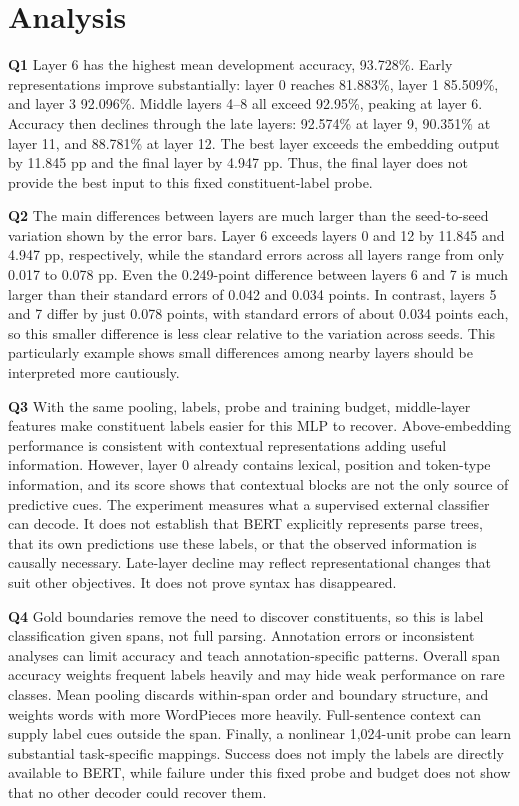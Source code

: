 \documentclass[11pt]{article}
\begin{document}
\newpage
\section*{Analysis}
\textbf{Q1}
Layer 6 has the highest mean development accuracy, 93.728\%. Early
representations improve substantially: layer 0 reaches 81.883\%, layer 1
85.509\%, and layer 3 92.096\%. Middle layers 4--8 all exceed 92.95\%, peaking
at layer 6. Accuracy then declines through the late layers: 92.574\% at layer 9,
90.351\% at layer 11, and 88.781\% at layer 12. The best layer exceeds the
embedding output by 11.845 pp and the final layer by 4.947 pp. Thus, the final
layer does not provide the best input to this fixed constituent-label probe.

\textbf{Q2}
The main differences between layers are much larger than the seed-to-seed
variation shown by the error bars. Layer 6 exceeds layers 0 and 12 by
11.845 and 4.947 pp, respectively, while the standard errors
across all layers range from only 0.017 to 0.078 pp.
Even the 0.249-point difference between layers 6 and 7 is much larger than
their standard errors of 0.042 and 0.034 points. In contrast, layers 5 and 7
differ by just 0.078 points, with standard errors of about 0.034 points each,
so this smaller difference is less clear relative to the variation across seeds. This particularly example shows small differences among nearby layers should be interpreted more cautiously.

\textbf{Q3}
With the same pooling, labels, probe and training budget, middle-layer features
make constituent labels easier for this MLP to recover. Above-embedding
performance is consistent with contextual representations adding useful
information. However, layer 0 already contains lexical, position and token-type
information, and its score shows that contextual blocks are not the only source
of predictive cues. The experiment measures what a supervised external
classifier can decode. It does not establish that BERT explicitly represents
parse trees, that its own predictions use these labels, or that the observed
information is causally necessary. Late-layer decline may reflect
representational changes that suit other objectives. It does not prove syntax
has disappeared.

\textbf{Q4}
Gold boundaries remove the need to discover constituents, so this is label
classification given spans, not full parsing. Annotation errors or inconsistent
analyses can limit accuracy and teach annotation-specific patterns. Overall
span accuracy weights frequent labels heavily and may hide weak performance on
rare classes. Mean pooling discards within-span order and boundary structure,
and weights words with more WordPieces more heavily. Full-sentence context
can supply label cues outside the span. Finally, a nonlinear 1,024-unit probe
can learn substantial task-specific mappings. Success does not imply the
labels are directly available to BERT, while failure under this fixed probe and
budget does not show that no other decoder could recover them.
\end{document}

